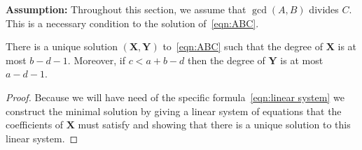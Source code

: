 \documentclass{article}
\begin{document}
\textbf{Assumption:} Throughout this section, we assume that $\gcd(A,B)$ divides $C$. This is a necessary condition to the solution of~\eqref{eqn:ABC}.

\begin{lem}\label{lem:ABC soln}
There is a unique solution $(\mathbf{X},\mathbf{Y})$ to~\eqref{eqn:ABC} such that the degree of $\mathbf{X}$ is at most $b-d-1$. Moreover, if $c < a+b-d$ then the degree of $\mathbf{Y}$ is at most $a-d-1$.

\begin{proof}
Because we will have need of the specific formula~\eqref{eqn:linear system} we construct the minimal solution by giving a linear system of equations that the coefficients of $\mathbf{X}$ must satisfy and showing that there is a unique solution to this linear system.


\end{proof}
\end{lem}
\end{document}
